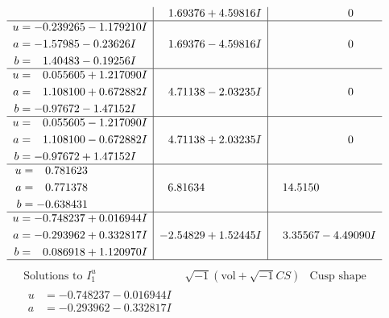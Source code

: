 \documentclass[1p]{elsarticle_modified}
\theoremstyle{definition}
\newcommand{\I}{\sqrt{-1}}
\begin{document}
$$\begin{array}{c|c|c}
 & \phantom{-}1.69376 + 4.59816 I & \phantom{-0.000000 } 0 \\ \hline\begin{aligned}
u &= -0.239265 - 1.179210 I \\
a &= -1.57985 - 0.23626 I \\
b &= \phantom{-}1.40483 - 0.19256 I\end{aligned}
 & \phantom{-}1.69376 - 4.59816 I & \phantom{-0.000000 } 0 \\ \hline\begin{aligned}
u &= \phantom{-}0.055605 + 1.217090 I \\
a &= \phantom{-}1.108100 + 0.672882 I \\
b &= -0.97672 - 1.47152 I\end{aligned}
 & \phantom{-}4.71138 - 2.03235 I & \phantom{-0.000000 } 0 \\ \hline\begin{aligned}
u &= \phantom{-}0.055605 - 1.217090 I \\
a &= \phantom{-}1.108100 - 0.672882 I \\
b &= -0.97672 + 1.47152 I\end{aligned}
 & \phantom{-}4.71138 + 2.03235 I & \phantom{-0.000000 } 0 \\ \hline\begin{aligned}
u &= \phantom{-}0.781623\phantom{ +0.000000I} \\
a &= \phantom{-}0.771378\phantom{ +0.000000I} \\
b &= -0.638431\phantom{ +0.000000I}\end{aligned}
 & \phantom{-}6.81634\phantom{ +0.000000I} & \phantom{-}14.5150\phantom{ +0.000000I} \\ \hline\begin{aligned}
u &= -0.748237 + 0.016944 I \\
a &= -0.293962 + 0.332817 I \\
b &= \phantom{-}0.086918 + 1.120970 I\end{aligned}
 & -2.54829 + 1.52445 I & \phantom{-}3.35567 - 4.49090 I\\
 \hline 
 \end{array}$$\newpage$$\begin{array}{c|c|c}  
\text{Solutions to }I^u_{1}& \I (\text{vol} + \sqrt{-1}CS) & \text{Cusp shape}\\
 \hline 
\begin{aligned}
u &= -0.748237 - 0.016944 I \\
a &= -0.293962 - 0.332817 I \\

\end{aligned}
\end{array}$$
\end{document}
